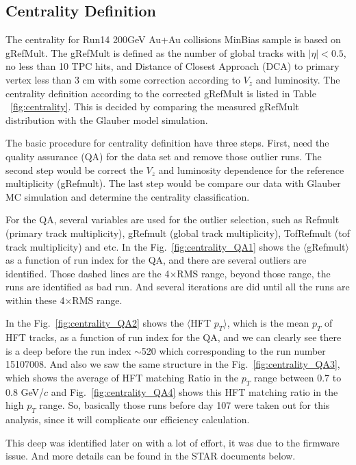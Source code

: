 \documentclass[a4paper]{article}
\begin{document}
\subsection{Centrality Definition}

The centrality for Run14 200GeV Au+Au collisions MinBias sample is based on gRefMult. The gRefMult is defined as the number of global tracks with $|\eta|<0.5$, no less than 10 TPC hits, and Distance of Closest Approach (DCA) to primary vertex less than 3 cm with some correction according to $V_{z}$ and luminosity. The centrality definition according to the corrected gRefMult is listed in Table ~\ref{fig:centrality}. This is decided by comparing the measured gRefMult distribution with the Glauber model simulation. 

The basic procedure for centrality definition have three steps. First, need the quality assurance (QA) for the data set and remove those outlier runs. The second step would be correct the $V_{z}$ and luminosity dependence for the reference multiplicity (gRefmult). The last step would be compare our data with Glauber MC simulation and determine the centrality classification.

For the QA, several variables are used for the outlier selection, such as Refmult (primary track multiplicity), gRefmult (global track multiplicity), TofRefmult (tof track multiplicity) and etc. In the Fig.~\ref{fig:centrality_QA1} shows the $\langle$gRefmult$\rangle$ as a function of run index for the QA, and there are several outliers are identified. Those dashed lines are the 4$\times$RMS range, beyond those range, the runs are identified as bad run. And several iterations are did until all the runs are within these 4$\times$RMS range.


In the Fig.~\ref{fig:centrality_QA2} shows the $\langle$HFT $p_{T}$$\rangle$, which is the mean $p_{T}$ of HFT tracks, as a function of run index for the QA, and we can clearly see there is a deep before the run index $\sim$520 which corresponding to the run number 15107008. And also we saw the same structure in the Fig.~\ref{fig:centrality_QA3}, which shows the average of HFT matching Ratio in the $p_{T}$ range between 0.7 to 0.8 GeV/$c$ and Fig.~\ref{fig:centrality_QA4} shows this HFT matching ratio in the high $p_{T}$ range. So, basically those runs before day 107 were taken out for this analysis, since it will complicate our efficiency calculation.

This deep was identified later on with a lot of effort, it was due to the firmware issue. And more details can be found in the STAR documents below.
\end{document}
